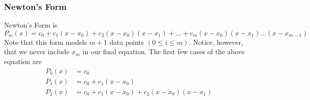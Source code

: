 \documentclass[letterpaper]{article}
\begin{document}
\subsubsection{Newton's Form}
Newton's Form is
\begin{equation}
    P_{m}(x) = c_0 + c_1 (x - x_0) + c_2 (x - x_0)(x - x_1) + \hdots + c_m (x - x_0)(x - x_1) \hdots (x - x_{m - 1})
\end{equation}
Note that this form models $m + 1$ data points $(0 \leq i \leq m)$. Notice, however, that we never include $x_m$ in our final equation. The first few cases of the above equation are 
\[\begin{aligned}
    P_{0}(x) &= c_0 \\ 
    P_{1}(x) &= c_0 + c_1 (x - x_0) \\ 
    P_{2}(x) &= c_0 + c_1 (x - x_0) + c_2 (x - x_0) (x - x_1)
\end{aligned}\]
\end{document}
